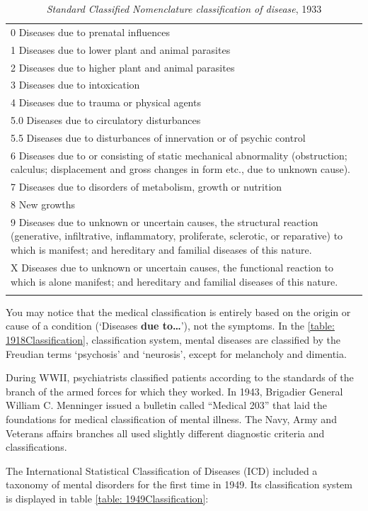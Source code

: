 \begin{refsection}
 \begin{longtable}[!t]{ | p{13.8cm}  | }
\hline
0 Diseases due to prenatal influences\\
1 Diseases due to lower plant and animal parasites\\
2 Diseases due to higher plant and animal parasites\\
3 Diseases due to intoxication\\
4 Diseases due to trauma or physical agents\\
5.0 Diseases due to circulatory disturbances\\
5.5 Diseases due to disturbances of innervation or of psychic control\\
6 Diseases due to or consisting of static mechanical abnormality (obstruction; calculus; displacement and gross changes in form etc., due to unknown cause).\\
7 Diseases due to disorders of metabolism, growth or nutrition\\
8 New growths\\
9 Diseases due to unknown or uncertain causes, the structural reaction (generative, infiltrative, inflammatory, proliferate, sclerotic, or reparative) to which is manifest; and hereditary and familial diseases of this nature.\\
X Diseases due to unknown or uncertain causes, the functional reaction to which is alone manifest; and hereditary and familial diseases of this nature.\\ \hline
\caption{\emph{Standard Classified Nomenclature classification of disease}, 1933}
\label{table: 1933Classification}
\end{longtable}


You may notice that the medical classification is entirely based on the origin or cause of a condition (`Diseases \textbf{due to{\ldots}}'), not the symptoms. In the \ref{table: 1918Classification}, classification system, mental diseases are classified by the Freudian terms `psychosis' and `neurosis', except for melancholy and dimentia.

During WWII, psychiatrists classified patients according to the standards of the branch of the armed forces for which they worked. In 1943, Brigadier General William C. Menninger issued a bulletin called ``Medical 203'' that laid the foundations for medical classification of mental illness. The Navy, Army and Veterans affairs branches all used slightly different diagnostic criteria and classifications.

The International Statistical Classification of Diseases (ICD) included a taxonomy of mental disorders for the first time in 1949. Its classification system is displayed in table \ref{table: 1949Classification}:


\end{refsection}
